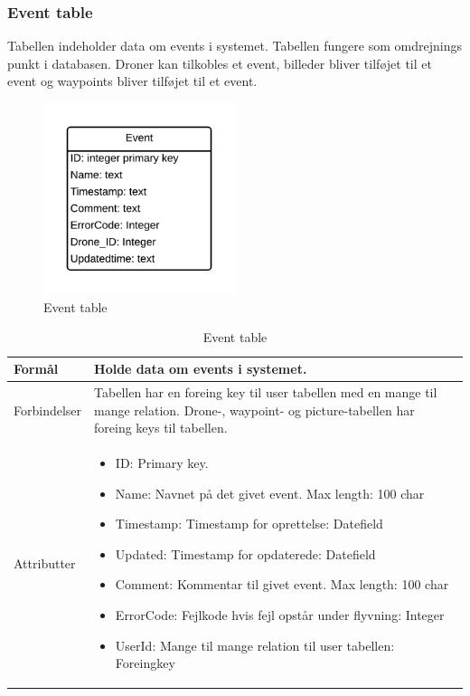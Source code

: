 \subsubsection*{Event table}
Tabellen indeholder data om events i systemet. Tabellen fungere som omdrejnings punkt i databasen. Droner kan tilkobles et event, billeder bliver tilføjet til et event og waypoints bliver tilføjet til et event.
\vspace{-5pt}
\begin{figure}[H]
	\centering
	\includegraphics[width=0.5\textwidth]{Billeder/database/EventTable.png}
	\vspace{-5pt}
	\caption{Event table}
	\label{fig:event_table}
\end{figure}

\begin{table}[H]
\begin{tabular}{| p{3cm}| p{11.5cm}|}
\hline

Formål	 							& Holde data om events i systemet.\\\hline
Forbindelser						& Tabellen har en foreing key til user tabellen med en mange til mange relation. Drone-, waypoint- og picture-tabellen har foreing keys til tabellen.\\\hline
Attributter						& \begin{itemize}
												\item ID: Primary key.
												\item Name: Navnet på det givet event. Max length: 100 char
												\item Timestamp: Timestamp for oprettelse: Datefield
												\item Updated: Timestamp for opdaterede: Datefield
												\item Comment: Kommentar til givet event. Max length: 100 char
												\item ErrorCode: Fejlkode hvis fejl opstår under flyvning: Integer
												\item UserId: Mange til mange relation til user tabellen: Foreingkey
											\end{itemize} \\\hline 
\end{tabular}
\caption{Event table}
\label{tab:event_table}
\end{table}